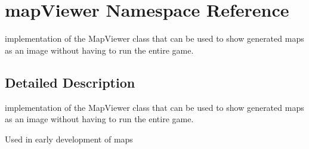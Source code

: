 \hypertarget{namespacemap_viewer}{}\section{map\+Viewer Namespace Reference}
\label{namespacemap_viewer}


implementation of the Map\+Viewer class that can be used to show generated maps as an image without having to run the entire game.  




\subsection{Detailed Description}
implementation of the Map\+Viewer class that can be used to show generated maps as an image without having to run the entire game. 

Used in early development of maps 